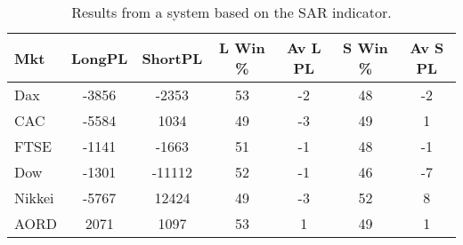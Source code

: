 \begin{table}[ht]
\centering
\caption[Results from a system based on the SAR indicator]{Results from a system based on the SAR indicator.} 
\label{tab:sar_results}
\begin{tabular}{lcccccc}
  \toprule Mkt & LongPL & ShortPL & L Win \% & Av L PL & S Win \% & Av S PL \\ 
  \midrule Dax & -3856 & -2353 & 53 & -2 & 48 & -2 \\ 
  CAC & -5584 & 1034 & 49 & -3 & 49 & 1 \\ 
  FTSE & -1141 & -1663 & 51 & -1 & 48 & -1 \\ 
  Dow & -1301 & -11112 & 52 & -1 & 46 & -7 \\ 
  Nikkei & -5767 & 12424 & 49 & -3 & 52 & 8 \\ 
  AORD & 2071 & 1097 & 53 & 1 & 49 & 1 \\ 
   \bottomrule \end{tabular}
\end{table}
